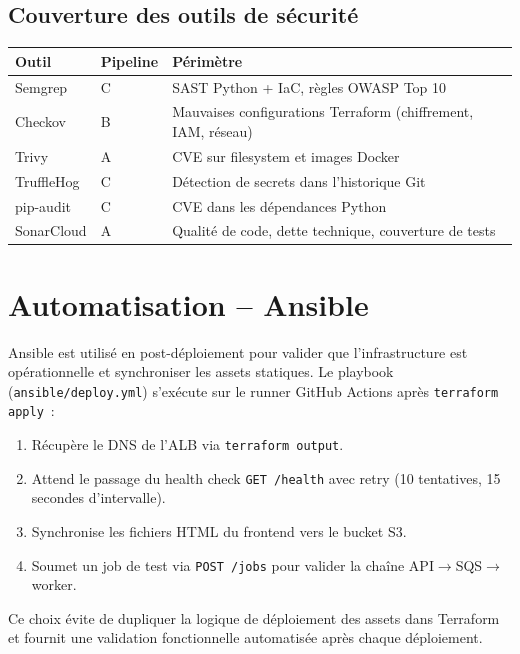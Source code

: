 \documentclass[11pt,a4paper]{article}
\newcommand{\code}[1]{\texttt{#1}}
\begin{document}
\subsection{Couverture des outils de s\'{e}curit\'{e}}

\begin{tabularx}{\linewidth}{llX}
\toprule
Outil & Pipeline & P\'{e}rim\`{e}tre \\
\midrule
Semgrep & C & SAST Python + IaC, r\`{e}gles OWASP Top 10 \\
Checkov & B & Mauvaises configurations Terraform (chiffrement, IAM, r\'{e}seau) \\
Trivy & A & CVE sur filesystem et images Docker \\
TruffleHog & C & D\'{e}tection de secrets dans l'historique Git \\
pip-audit & C & CVE dans les d\'{e}pendances Python \\
SonarCloud & A & Qualit\'{e} de code, dette technique, couverture de tests \\
\bottomrule
\end{tabularx}

\section{Automatisation -- Ansible}

Ansible est utilis\'{e} en post-d\'{e}ploiement pour valider que l'infrastructure est op\'{e}rationnelle et synchroniser les assets statiques. Le playbook (\code{ansible/deploy.yml}) s'ex\'{e}cute sur le runner GitHub Actions apr\`{e}s \code{terraform apply}~:

\begin{enumerate}[noitemsep]
  \item R\'{e}cup\`{e}re le DNS de l'ALB via \code{terraform output}.
  \item Attend le passage du health check \code{GET /health} avec retry (10 tentatives, 15 secondes d'intervalle).
  \item Synchronise les fichiers HTML du frontend vers le bucket S3.
  \item Soumet un job de test via \code{POST /jobs} pour valider la cha\^{i}ne API$\to$SQS$\to$worker.
\end{enumerate}

Ce choix \'{e}vite de dupliquer la logique de d\'{e}ploiement des assets dans Terraform et fournit une validation fonctionnelle automatis\'{e}e apr\`{e}s chaque d\'{e}ploiement.
\end{document}

